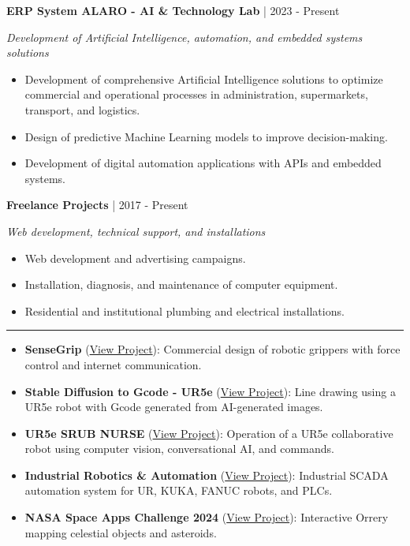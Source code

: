 \documentclass[10pt,letterpaper]{article}
\newcommand{\sectionline}{\vspace{-2pt}\textcolor{accent}{\rule{\linewidth}{0.8pt}}\vspace{1pt}}
\newcommand{\cvsection}[1]{\vspace{5pt}{\large\bfseries\textcolor{navy}{#1}}\par\sectionline}
\newcommand{\entry}[3]{\textbf{#1} \textcolor{muted}{| #2}\par\textit{#3}\par}
\newcommand{\projectlink}[1]{\href{#1}{View Project}}
\begin{document}
\entry{ERP System ALARO - AI \& Technology Lab}{2023 - Present}{Development of Artificial Intelligence, automation, and embedded systems solutions}
\begin{itemize}
  \item Development of comprehensive Artificial Intelligence solutions to optimize commercial and operational processes in administration, supermarkets, transport, and logistics.
  \item Design of predictive Machine Learning models to improve decision-making.
  \item Development of digital automation applications with APIs and embedded systems.
\end{itemize}

\entry{Freelance Projects}{2017 - Present}{Web development, technical support, and installations}
\begin{itemize}
  \item Web development and advertising campaigns.
  \item Installation, diagnosis, and maintenance of computer equipment.
  \item Residential and institutional plumbing and electrical installations.
\end{itemize}

\cvsection{Key Academic Projects}
\begin{itemize}
  \item \textbf{\textmu{}SenseGrip} (\projectlink{https://jphajp.github.io/JPHAJP/\#proyectos}): Commercial design of robotic grippers with force control and internet communication.
  \item \textbf{Stable Diffusion to Gcode - UR5e} (\projectlink{https://github.com/JPHAJP/StableDiffusion_t_gcode}): Line drawing using a UR5e robot with Gcode generated from AI-generated images.
  \item \textbf{UR5e SRUB NURSE} (\projectlink{https://jphajp.github.io/UR5_SRUB_NURSE/}): Operation of a UR5e collaborative robot using computer vision, conversational AI, and commands.
  \item \textbf{Industrial Robotics \& Automation} (\projectlink{https://jphajp.github.io/JPHAJP/Web/projects/4\%20-\%20PLC/All\%20SCADA.pdf}): Industrial SCADA automation system for UR, KUKA, FANUC robots, and PLCs.
  \item \textbf{NASA Space Apps Challenge 2024} (\projectlink{https://jphajp.github.io/JPHAJP/Web/projects/1\%20-\%20Nasa/template_project.html}): Interactive Orrery mapping celestial objects and asteroids.
\end{itemize}
\end{document}
